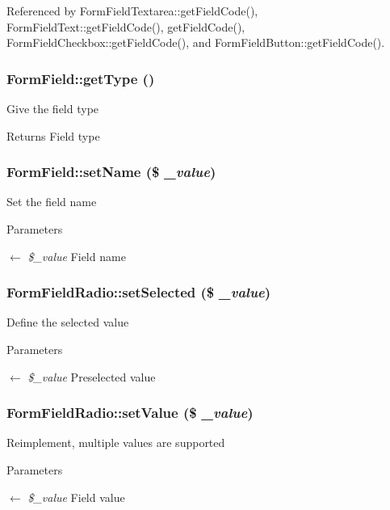 Referenced by FormFieldTextarea::getFieldCode(), FormFieldText::getFieldCode(), getFieldCode(), FormFieldCheckbox::getFieldCode(), and FormFieldButton::getFieldCode().

\subsubsection[{getType}]{\setlength{\rightskip}{0pt plus 5cm}FormField::getType ()}\label{classFormField_a1f64b737bccb6b2827f8c5665b9920c7}
Give the field type \begin{DoxyReturn}{Returns}
Field type 
\end{DoxyReturn}
\subsubsection[{setName}]{\setlength{\rightskip}{0pt plus 5cm}FormField::setName (\$ {\em \_\-value})}\label{classFormField_ad57e32bd53170af060e869b3b60f0ef7}
Set the field name 
\begin{DoxyParams}{Parameters}
\item[\mbox{$\leftarrow$} {\em \$\_\-value}]Field name \end{DoxyParams}
\subsubsection[{setSelected}]{\setlength{\rightskip}{0pt plus 5cm}FormFieldRadio::setSelected (\$ {\em \_\-value})}\label{classFormFieldRadio_a2fc7c97f763930e5bdd8f7cbb7f3c98f}
Define the selected value 
\begin{DoxyParams}{Parameters}
\item[\mbox{$\leftarrow$} {\em \$\_\-value}]Preselected value \end{DoxyParams}
\subsubsection[{setValue}]{\setlength{\rightskip}{0pt plus 5cm}FormFieldRadio::setValue (\$ {\em \_\-value})}\label{classFormFieldRadio_aab105e92866fd80890d3254f51a2e4ca}
Reimplement, multiple values are supported 
\begin{DoxyParams}{Parameters}
\item[\mbox{$\leftarrow$} {\em \$\_\-value}]Field value \end{DoxyParams}


